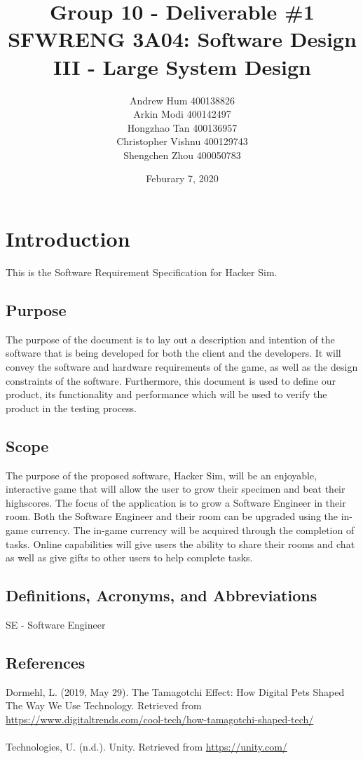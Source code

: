 \documentclass[]{article}
\title{
    \bf{Group 10 - Deliverable \#1}\\
    \large SFWRENG 3A04: Software Design III - Large System Design
}
\author{
    Andrew Hum 400138826\\
    Arkin Modi 400142497\\
    Hongzhao Tan 400136957\\
    Christopher Vishnu 400129743\\
    Shengchen Zhou 400050783\\
}
\date{Feburary 7, 2020}
\begin{document}
\maketitle	
\newpage

\section{Introduction}
\label{sec:introduction}
This is the Software Requirement Specification for Hacker Sim.

\subsection{Purpose}
\label{sub:purpose}
The purpose of the document is to lay out a description and intention of the 
software that is being developed for both the client and the developers. It 
will convey the software and hardware requirements of the game, as well as the 
design constraints of the software. Furthermore, this document is used to define 
our product, its functionality and performance which will be used to verify the 
product in the testing process. 

\subsection{Scope}
\label{sub:scope}
The purpose of the proposed software, Hacker Sim, will be an enjoyable, 
interactive game that will allow the user to grow their specimen and beat their 
highscores. The focus of the application is to grow a Software Engineer in their 
room. Both the Software Engineer and their room can be upgraded using the 
in-game currency. The in-game currency will be acquired through the completion 
of tasks. Online capabilities will give users the ability to share their rooms 
and chat as well as give gifts to other users to help complete tasks. 


\subsection{Definitions, Acronyms, and Abbreviations}
\label{sub:definitions_acronyms_and_abbreviations}
SE - Software Engineer

\subsection{References}
\label{sub:references}
Dormehl, L. (2019, May 29). The Tamagotchi Effect: How Digital Pets Shaped The 
Way We Use Technology. Retrieved from 
\url{https://www.digitaltrends.com/cool-tech/how-tamagotchi-shaped-tech/}
\\\\
Technologies, U. (n.d.). Unity. Retrieved from \url{https://unity.com/}
\end{document}
